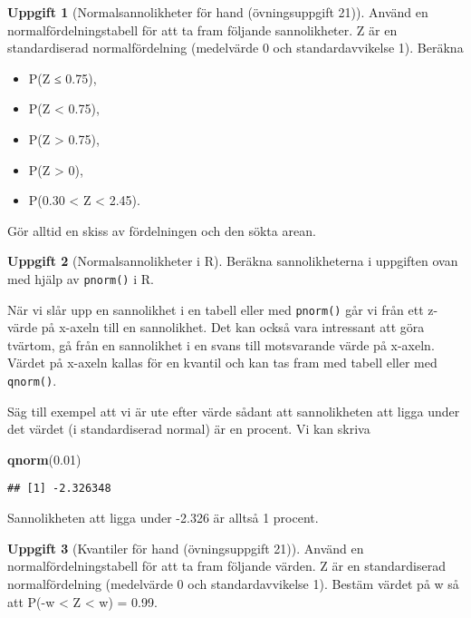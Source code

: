\documentclass[
]{book}
\newenvironment{Shaded}{\begin{snugshade}}{\end{snugshade}}
\newcommand{\FloatTok}[1]{\textcolor[rgb]{0.00,0.00,0.81}{#1}}
\newcommand{\FunctionTok}[1]{\textcolor[rgb]{0.13,0.29,0.53}{\textbf{#1}}}
\newcommand{\NormalTok}[1]{#1}
\providecommand{\tightlist}{%
  \setlength{\itemsep}{0pt}\setlength{\parskip}{0pt}}
\theoremstyle{definition}
\theoremstyle{definition}
\theoremstyle{definition}
\newtheorem{exercise}{Uppgift}[chapter]
\theoremstyle{definition}
\theoremstyle{remark}
\begin{document}
\begin{exercise}[Normalsannolikheter för hand (övningsuppgift 21)]
Använd en normalfördelningstabell för att ta fram följande sannolikheter.
Z är en standardiserad normalfördelning (medelvärde 0 och standardavvikelse 1). Beräkna

\begin{itemize}
\tightlist
\item
  P(Z ≤ 0.75),
\item
  P(Z \textless{} 0.75),
\item
  P(Z \textgreater{} 0.75),
\item
  P(Z \textgreater{} 0),
\item
  P(0.30 \textless{} Z \textless{} 2.45).
\end{itemize}

Gör alltid en skiss av fördelningen och den sökta arean.
\end{exercise}

\begin{exercise}[Normalsannolikheter i R]
Beräkna sannolikheterna i uppgiften ovan med hjälp av \texttt{pnorm()} i R.
\end{exercise}

När vi slår upp en sannolikhet i en tabell eller med \texttt{pnorm()} går vi från ett z-värde på x-axeln till en sannolikhet.
Det kan också vara intressant att göra tvärtom, gå från en sannolikhet i en svans till motsvarande värde på x-axeln.
Värdet på x-axeln kallas för en kvantil och kan tas fram med tabell eller med \texttt{qnorm()}.

Säg till exempel att vi är ute efter värde sådant att sannolikheten att ligga under det värdet (i standardiserad normal) är en procent.
Vi kan skriva

\begin{Shaded}
\begin{Highlighting}[]
\FunctionTok{qnorm}\NormalTok{(}\FloatTok{0.01}\NormalTok{)}
\end{Highlighting}
\end{Shaded}

\begin{verbatim}
## [1] -2.326348
\end{verbatim}

Sannolikheten att ligga under -2.326 är alltså 1 procent.

\begin{exercise}[Kvantiler för hand (övningsuppgift 21)]
Använd en normalfördelningstabell för att ta fram följande värden.
Z är en standardiserad normalfördelning (medelvärde 0 och standardavvikelse 1).
Bestäm värdet på w så att P(-w \textless{} Z \textless{} w) = 0.99.
\end{exercise}
\end{document}
